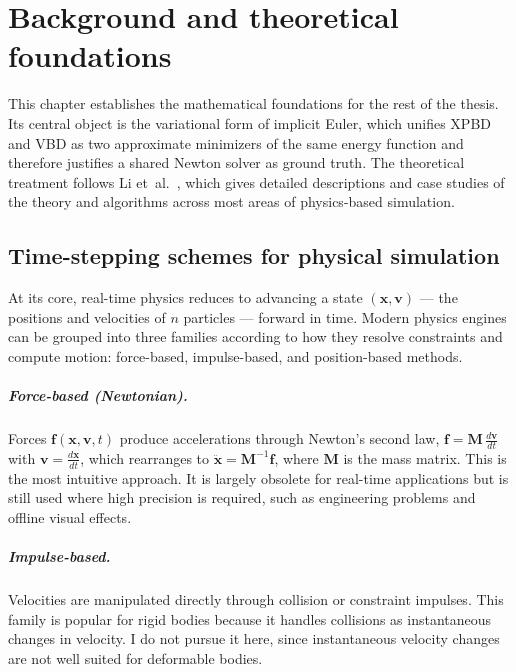 \chapter{Background and theoretical foundations}
\label{chap:Background}

This chapter establishes the mathematical foundations for the rest of the
thesis. Its central object is the variational form of implicit Euler, which
unifies XPBD and VBD as two approximate minimizers of the same energy function
and therefore justifies a shared Newton solver as ground truth. The theoretical
treatment follows Li et~al.~\cite{li2026physics}, which gives detailed
descriptions and case studies of the theory and algorithms across most areas of
physics-based simulation.

\section{Time-stepping schemes for physical simulation}
\label{sec:Integration}
At its core, real-time physics reduces to advancing a state
$(\mathbf{x}, \mathbf{v})$ --- the positions and velocities of $n$ particles ---
forward in time. Modern physics engines can be grouped into three families
according to how they resolve constraints and compute motion: force-based,
impulse-based, and position-based methods.

\paragraph{Force-based (Newtonian).}
Forces $\mathbf{f}(\mathbf{x}, \mathbf{v}, t)$ produce accelerations through
Newton's second law, $\mathbf{f} = \mathbf{M}\,\tfrac{d\mathbf{v}}{dt}$ with
$\mathbf{v} = \tfrac{d\mathbf{x}}{dt}$, which rearranges to
$\ddot{\mathbf{x}} = \mathbf{M}^{-1}\mathbf{f}$, where $\mathbf{M}$ is the mass
matrix. This is the most intuitive approach. It is largely obsolete for real-time
applications but is still used where high precision is required, such as
engineering problems and offline visual effects.

\paragraph{Impulse-based.}
Velocities are manipulated directly through collision or constraint impulses.
This family is popular for rigid bodies because it handles collisions as
instantaneous changes in velocity. I do not pursue it here, since instantaneous
velocity changes are not well suited for deformable bodies.

